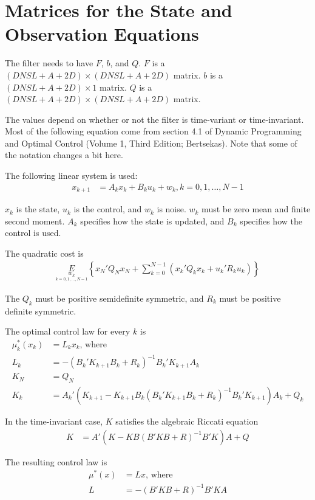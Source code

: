 \documentclass[]{article}
\begin{document}
\section{Matrices for the State and Observation Equations}

The filter needs to have $F$, $b$, and $Q$.
$F$ is a $(DNSL + A + 2D) \times (DNSL + A + 2D)$ matrix.
$b$ is a $(DNSL + A + 2D) \times 1$ matrix.
$Q$ is a $(DNSL + A + 2D) \times (DNSL + A + 2D)$ matrix.

The values depend on whether or not the filter is time-variant or time-invariant.
Most of the following equation come from section 4.1 of Dynamic Programming and Optimal Control (Volume 1, Third Edition; Bertsekas).
Note that some of the notation changes a bit here.

The following linear system is used:
\begin{align*}
x_{k+1} &= A_kx_k + B_ku_k + w_k, k = 0,1,\ldots,N-1
\end{align*}

$x_k$ is the state, $u_k$ is the control, and $w_k$ is noise.
$w_k$ must be zero mean and finite second moment.
$A_k$ specifies how the state is updated, and $B_k$ specifies how the control is used.

The quadratic cost is
\begin{align*}
\underset{\underset{k=0,1,\ldots,N-1}{w_k}}{E}\left\{x_N'Q_Nx_N + \sum_{k=0}^{N-1}(x_k'Q_kx_k + u_k'R_ku_k)\right\}
\end{align*}

The $Q_k$ must be positive semidefinite symmetric, and $R_k$ must be positive definite symmetric.

The optimal control law for every $k$ is
\begin{align*}
\mu_k^*(x_k) &= L_kx_k\textrm{, where} \\
L_k &= -(B_k'K_{k+1}B_k+R_k)^{-1}B_k'K_{k+1}A_k \\
K_N &= Q_N \\
K_k &= A_k'(K_{k+1}-K_{k+1}B_k(B_k'K_{k+1}B_k+R_k)^{-1}B_k'K_{k+1})A_k + Q_k
\end{align*}

In the time-invariant case, $K$ satisfies the algebraic Riccati equation
\begin{align*}
K &= A'(K-KB(B'KB+R)^{-1}B'K)A + Q
\end{align*}

The resulting control law is
\begin{align*}
\mu^*(x) &= Lx\textrm{, where} \\
L &= -(B'KB+R)^{-1}B'KA \\
\end{align*}
\end{document}
